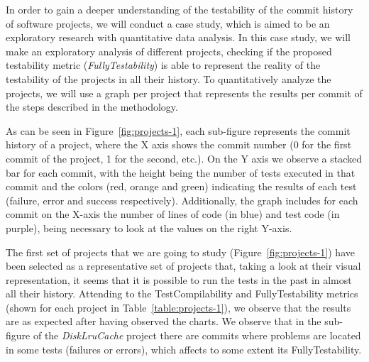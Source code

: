 In order to gain a deeper understanding of the testability of the commit history of software projects, we will conduct a case study, which is aimed to be an exploratory research with quantitative data analysis. 
In this case study, we will make an exploratory analysis of different projects, checking if the proposed testability metric (\textit{FullyTestability}) is able to represent the reality of the testability of the projects in all their history.
To quantitatively analyze the projects, we will use a graph per project that represents the results per commit of the steps described in the methodology. 

As can be seen in Figure~\ref{fig:projects-1}, each sub-figure represents the commit history of a project, where the X axis shows the commit number (0 for the first commit of the project, 1 for the second, etc.). On the Y axis we observe a stacked bar for each commit, with the height being the number of tests executed in that commit and the colors (red, orange and green) indicating the results of each test (failure, error and success respectively). Additionally, the graph includes for each commit on the X-axis the number of lines of code (in blue) and test code (in purple), being necessary to look at the values on the right Y-axis.


The first set of projects that we are going to study (Figure~\ref{fig:projects-1}) have been selected as a representative set of projects that, taking a look at their visual representation, it seems that it is possible to run the tests in the past in almost all their history.
Attending to the TestCompilability and FullyTestability metrics (shown for each project in Table~\ref{table:projects-1}), we observe that the results are as expected after having observed the charts.
We observe that in the sub-figure of the \textit{DiskLruCache} project there are commits where problems are located in some tests (failures or errors), which affects to some extent its FullyTestability.

